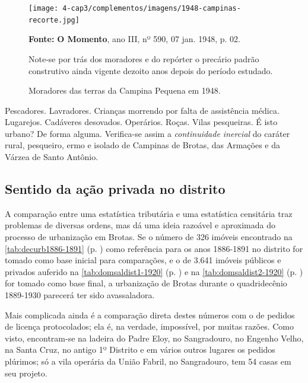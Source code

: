 
\begin{figure}[!htp]
\centering
\caption{Moradores das terras da Campina Pequena em 1948.}
\texttt{[image: 4-cap3/complementos/imagens/1948-campinas-recorte.jpg]}{\par \footnotesize \textbf{Fonte:} \textbf{O Momento}, ano III, nº 590, 07 jan. 1948, p. 02. \par Note-se por trás dos moradores e do repórter o precário padrão construtivo ainda vigente dezoito anos depois do período estudado.}
\label{fig:amaralina1928}
\end{figure}

Pescadores. Lavradores. Crianças morrendo por falta de assistência médica. Lugarejos. Cadáveres desovados. Operários. Roças. Vilas pesqueiras. É isto urbano? De forma alguma. Verifica-se assim a \textit{continuidade inercial} do caráter rural, pesqueiro, ermo e isolado de Campinas de Brotas, das Armações e da Várzea de Santo Antônio.

\subsection{Sentido da ação privada no distrito}

A comparação entre uma estatística tributária e uma estatística censitária traz problemas de diversas ordens, mas dá uma ideia razoável e aproximada do processo de urbanização em Brotas. Se o número de 326 imóveis encontrado na \autoref{tab:decurb1886-1891} (p. \pageref{tab:decurb1886-1891}) como referência para os anos 1886-1891 no distrito for tomado como base inicial para comparações, e o de 3.641 imóveis públicos e privados auferido na \autoref{tab:domsaldist1-1920} (p. \pageref{tab:domsaldist1-1920}) e na \autoref{tab:domsaldist2-1920} (p. \pageref{tab:domsaldist2-1920}) for tomado como base final, a urbanização de Brotas durante o quadridecênio 1889-1930 parecerá ter sido avassaladora.

Mais complicada ainda é a comparação direta destes números com o de pedidos de licença protocolados; ela é, na verdade, impossível, por muitas razões. Como visto, encontram-se na ladeira do Padre Eloy, no Sangradouro, no Engenho Velho, na Santa Cruz, no antigo 1º Distrito e em vários outros lugares os pedidos plúrimos; só a vila operária da União Fabril, no Sangradouro, tem 54 casas em seu projeto.

